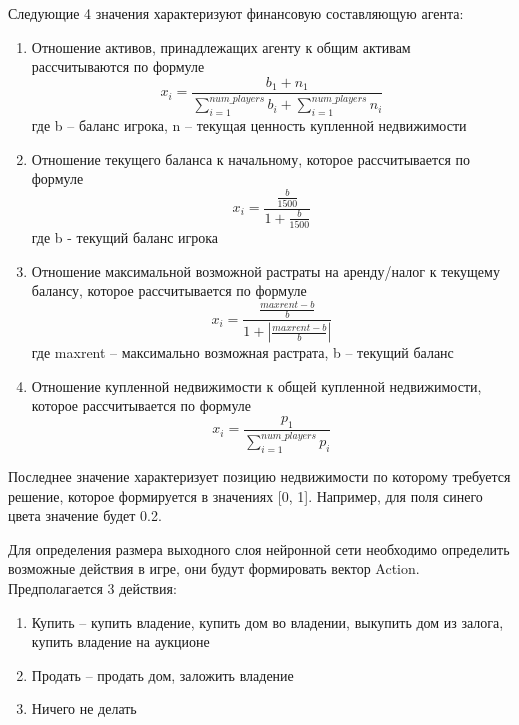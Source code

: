 \begin{Large}
Следующие 4 значения характеризуют финансовую составляющую агента:
\begin{enumerate}
    \item Отношение активов, принадлежащих агенту к общим активам рассчитываются по формуле 
    \begin{equation}
        x_i = \frac{b_1+n_1}{\sum_{i=1}^{num\_players}b_i + \sum_{i=1}^{num\_players}n_i}
    \end{equation}
    где b – баланс игрока, n – текущая ценность купленной недвижимости
    \item Отношение текущего баланса к начальному, которое рассчитывается по формуле
    \begin{equation}
        x_i = \frac{\frac{b}{1500}}{1+\frac{b}{1500}}
    \end{equation}
    где b -  текущий баланс игрока
    \item Отношение максимальной возможной растраты на аренду/налог к текущему балансу, которое рассчитывается по формуле
    \begin{equation}
        x_i = \frac{\frac{maxrent-b}{b}}{1+|\frac{maxrent-b}{b}|}
    \end{equation}    
    где maxrent – максимально возможная растрата, b – текущий баланс
    \item Отношение купленной недвижимости к общей купленной недвижимости, которое рассчитывается по формуле
    \begin{equation}
        x_i = \frac{p_1}{\sum_{i=1}^{num\_players}p_i}
    \end{equation}
\end{enumerate}

Последнее значение характеризует позицию недвижимости по которому требуется решение, которое формируется в значениях [0, 1]. Например, для поля синего цвета значение будет 0.2.

Для определения размера выходного слоя нейронной сети необходимо определить возможные действия в игре, они будут формировать вектор Action. Предполагается 3 действия:
\begin{spacing}{0.9}
\begin{enumerate}
    \item Купить – купить владение, купить дом во владении, выкупить дом из залога, купить владение на аукционе
    \item Продать – продать дом, заложить владение
    \item Ничего не делать
\end{enumerate}
\end{spacing}

\end{Large}
